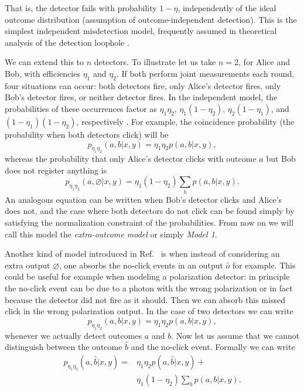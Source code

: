 \documentclass[aps,pra,reprint, superscriptaddress,showkeys]{revtex4-2}
\theoremstyle{plain}
\begin{document}
That is, the detector fails with probability $1 - \eta$, independently of the ideal outcome distribution (assumption of outcome-independent detection). This is the simplest independent misdetection model, frequently assumed in theoretical analysis of the detection loophole \cite{Garbarino2010}. 

We can extend this to $n$ detectors. To illustrate let us take $n=2$, for Alice and Bob, with efficiencies 
$\eta_1$ and $\eta_2$. If both perform joint measurements  each round, four 
situations can occur: both detectors fire, only Alice's detector fires, only Bob's detector fires, or neither detector fires. In the independent model, 
the probabilities of these occurrences factor as $\eta_1 \eta_2$, $\eta_1 (1 - \eta_2)$, $\eta_2 (1 - \eta_1)$, and $(1 - \eta_1)(1 - \eta_2)$, respectively \cite{Garbarino2010}. For example, the  coincidence  probability (the probability when both detectors click) will be
\begin{equation}
    p_{\eta_1 \eta_2}(a,b|x,y) = \eta_1 \eta_2 p(a,b|x,y),\label{eq: Model_abs_1}
\end{equation}
whereas the probability that only Alice's detector clicks with outcome $a$ but Bob does not register anything  is~\cite{Garbarino2010, Wilms2008}
\begin{equation}
    p_{\eta_1 \eta_2}(a,\varnothing|x,y) = \eta_1 (1 - \eta_2)\sum_b p(a,b|x,y).\label{eq: Model_abs_3}
\end{equation}
An analogous equation can be written when Bob's detector clicks and Alice's does not, and the case where both detectors do not click can be found simply by satisfying the normalization constraint of the probabilities.  From now on we will call this model the \textit{extra-outcome model} or simply \textit{Model 1}.


Another kind of model introduced in Ref.~\cite{Wilms2008} is when instead of considering an extra output $\varnothing$, one absorbs the no-click events in an output $\hat o$ for example.  This could be useful for example when modeling a polarization detector: in principle the no-click event can be due to a photon with the wrong polarization or in fact because the detector did not fire as it should. Then we can absorb this missed click in the wrong polarization output. In the case of two detectors we can write 
\begin{equation}
    p_{\eta_1 \eta_2}(a,b|x,y) = \eta_1\eta_2 p(a,b|x,y),\label{eq:abs_1}
\end{equation}
whenever we actually detect outcomes $a$ and $b$. Now let us assume that we cannot distinguish between the outcome $\hat b$ and the no-click event. Formally we can write
\begin{eqnarray}
    p_{\eta_1 \eta_2}(a,\hat b| x, y) =& \eta_1\eta_2 p(a,\hat b|x,y) + \nonumber \\& \eta_1(1-\eta_2)\sum_b p(a,b|x,y).\label{eq:abs_2}
\end{eqnarray}
\end{document}
